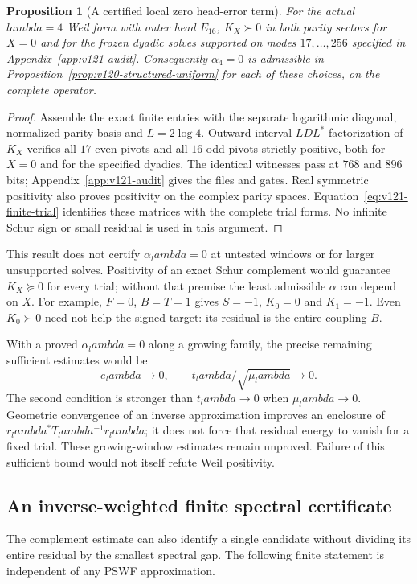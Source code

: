 \documentclass[11pt]{article}
\def\lambda{lambda}%
\newtheorem{proposition}[theorem]{Proposition}
\theoremstyle{remark}
\begin{document}
\begin{proposition}[A certified local zero head-error term]
\label{prop:v121-alpha-zero}
For the actual $\lambda=4$ Weil form with outer head $E_{16}$,
$K_X\succ0$ in both parity sectors for $X=0$ and for the frozen
dyadic solves supported on modes $17,\ldots,256$ specified in
Appendix~\ref{app:v121-audit}. Consequently $\alpha_4=0$ is
admissible in Proposition~\ref{prop:v120-structured-uniform} for
each of these choices, on the complete operator.
\end{proposition}
\begin{proof}
Assemble the exact finite entries with the separate logarithmic
diagonal, normalized parity basis and $L=2\log4$. Outward interval
$LDL^*$ factorization of $K_X$ verifies all $17$ even pivots and
all $16$ odd pivots strictly positive, both for $X=0$ and for the
specified dyadics. The identical witnesses pass at $768$ and $896$
bits; Appendix~\ref{app:v121-audit} gives the files and gates.
Real symmetric positivity also proves positivity on the complex
parity spaces. Equation~\eqref{eq:v121-finite-trial} identifies these
matrices with the complete trial forms. No infinite Schur sign or
small residual is used in this argument.
\end{proof}

This result does not certify $\alpha_\lambda=0$ at untested windows
or for larger unsupported solves. Positivity of an exact Schur
complement would guarantee $K_X\succeq0$ for every trial; without
that premise the least admissible $\alpha$ can depend on $X$.
For example, $F=0$, $B=T=1$ gives $S=-1$, $K_0=0$ and $K_1=-1$.
Even $K_0\succ0$ need not help the signed target: its residual is
the entire coupling $B$.

With a proved $\alpha_\lambda=0$ along a growing family, the precise
remaining sufficient estimates would be
\begin{equation}\label{eq:v121-scaled-target}
 e_\lambda\longrightarrow0,
 \qquad t_\lambda/\sqrt{\mu_\lambda}\longrightarrow0.
\end{equation}
The second condition is stronger than $t_\lambda\to0$ when
$\mu_\lambda\to0$. Geometric convergence of an inverse approximation
improves an enclosure of $r_\lambda^*T_\lambda^{-1}r_\lambda$;
it does not force that residual energy to vanish for a fixed trial.
These growing-window estimates remain unproved. Failure of this
sufficient bound would not itself refute Weil positivity.


\subsection{An inverse-weighted finite spectral certificate}
The complement estimate can also identify a single candidate without
dividing its entire residual by the smallest spectral gap.
The following finite statement is independent of any PSWF approximation.
\end{document}
